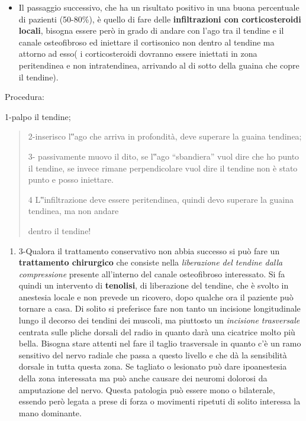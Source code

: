 \documentclass[]{article}
\begin{document}
\begin{itemize}
\item
  Il passaggio successivo, che ha un risultato positivo in una buona
  percentuale di pazienti (50-80\%), è quello di fare delle
  \textbf{infiltrazioni con corticosteroidi locali}, bisogna essere però
  in grado di andare con l'ago tra il tendine e il canale osteofibroso
  ed iniettare il cortisonico non dentro al tendine ma attorno ad esso(
  i corticosteroidi dovranno essere iniettati in zona peritendinea e non
  intratendinea, arrivando al di sotto della guaina che copre il
  tendine).
\end{itemize}

Procedura:

1-palpo il tendine;

\begin{quote}
2-inserisco l‟ago che arriva in profondità, deve superare la guaina
tendinea;

3- passivamente muovo il dito, se l‟ago ``sbandiera'' vuol dire che ho
punto il tendine, se invece rimane perpendicolare vuol dire il tendine
non è stato punto e posso iniettare.

4 L‟infiltrazione deve essere peritendinea, quindi devo superare la
guaina tendinea, ma non andare

dentro il tendine!
\end{quote}

\begin{enumerate}
\def\labelenumi{\arabic{enumi}.}
\item
  3-Qualora il trattamento conservativo non abbia successo si può fare
  un \textbf{trattamento chirurgico} che consiste nella
  \emph{liberazione del tendine dalla compressione} presente all'interno
  del canale osteofibroso interessato. Si fa quindi un intervento di
  \textbf{tenolisi}, di liberazione del tendine, che è svolto in
  anestesia locale e non prevede un ricovero, dopo qualche ora il
  paziente può tornare a casa. Di solito si preferisce fare non tanto un
  incisione longitudinale lungo il decorso dei tendini dei muscoli, ma
  piuttosto un \emph{incisione trasversale} centrata sulle pliche
  dorsali del radio in quanto darà una cicatrice molto più bella.
  Bisogna stare attenti nel fare il taglio trasversale in quanto c'è un
  ramo sensitivo del nervo radiale che passa a questo livello e che dà
  la sensibilità dorsale in tutta questa zona. Se tagliato o lesionato
  può dare ipoanestesia della zona interessata ma può anche causare dei
  neuromi dolorosi da amputazione del nervo. Questa patologia può essere
  mono o bilaterale, essendo però legata a prese di forza o movimenti
  ripetuti di solito interessa la mano dominante.
\end{enumerate}
\end{document}
